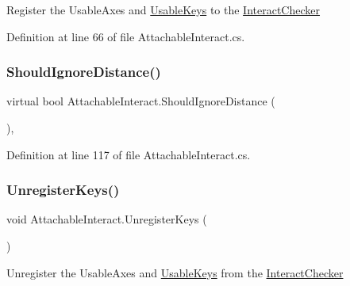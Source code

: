 Register the Usable\+Axes and \mbox{\hyperlink{class_attachable_interact_a3c3ffc1d5b3cfd3bc9b4fde20a772901}{Usable\+Keys}} to the \mbox{\hyperlink{class_interact_checker}{Interact\+Checker}} 



Definition at line 66 of file Attachable\+Interact.\+cs.

\mbox{\label{class_attachable_interact_adbfe794fcb2bb817dbc62310c43c687e}} 
\subsubsection{\texorpdfstring{Should\+Ignore\+Distance()}{ShouldIgnoreDistance()}}
{\footnotesize\ttfamily virtual bool Attachable\+Interact.\+Should\+Ignore\+Distance (\begin{DoxyParamCaption}{ }\end{DoxyParamCaption})\hspace{0.3cm}{\ttfamily [protected]}, {\ttfamily [virtual]}}



Definition at line 117 of file Attachable\+Interact.\+cs.

\mbox{\label{class_attachable_interact_ab657260ae7954daa9d4c5f938790910d}} 
\subsubsection{\texorpdfstring{Unregister\+Keys()}{UnregisterKeys()}}
{\footnotesize\ttfamily void Attachable\+Interact.\+Unregister\+Keys (\begin{DoxyParamCaption}{ }\end{DoxyParamCaption})\hspace{0.3cm}{\ttfamily [protected]}}



Unregister the Usable\+Axes and \mbox{\hyperlink{class_attachable_interact_a3c3ffc1d5b3cfd3bc9b4fde20a772901}{Usable\+Keys}} from the \mbox{\hyperlink{class_interact_checker}{Interact\+Checker}} 



